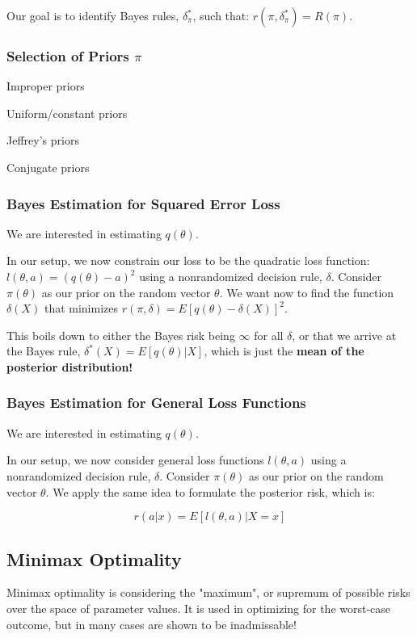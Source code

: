 		Our goal is to identify Bayes rules, $\delta_\pi^*$, such that: $r(\pi, \delta_\pi^*) = R(\pi)$.

		\subsubsection{Selection of Priors $\pi$}
			
			Improper priors

			Uniform/constant priors 

			Jeffrey's priors

			Conjugate priors

		\subsubsection{Bayes Estimation for Squared Error Loss}

			We are interested in estimating $q(\theta)$.

			In our setup, we now constrain our loss to be the quadratic loss function: $l(\theta, a) = (q(\theta) - a)^2$ using a nonrandomized decision rule, $\delta$. Consider $\pi(\theta)$ as our prior on the random vector $\theta$. We want now to find the function $\delta(X)$ that minimizes $r(\pi, \delta) = E[ q(\theta) - \delta(X) ]^2$.

			This boils down to either the Bayes risk being $\infty$ for all $\delta$, or that we arrive at the Bayes rule, $\delta^*(X) = E[ q(\theta) | X ]$, which is just the \textbf{mean of the posterior distribution!}

		\subsubsection{Bayes Estimation for General Loss Functions}

			We are interested in estimating $q(\theta)$.

			In our setup, we now consider general loss functions $l(\theta, a)$ using a nonrandomized decision rule, $\delta$. Consider $\pi(\theta)$ as our prior on the random vector $\theta$. We apply the same idea to formulate the posterior risk, which is:

			$$r(a | x) = E [ l(\theta, a) | X=x ]$$

	\subsection{Minimax Optimality}

		Minimax optimality is considering the "maximum", or supremum of possible risks over the space of parameter values. It is used in optimizing for the worst-case outcome, but in many cases are shown to be inadmissable!



